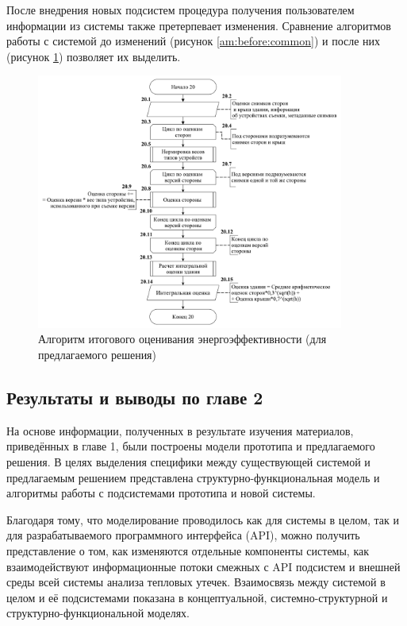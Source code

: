 \pagebreak

\par
	После внедрения новых подсистем процедура получения пользователем информации из системы также претерпевает изменения. Сравнение алгоритмов работы с системой до изменений (рисунок \ref{am:before:common}) и после них (рисунок \ref{am:after:common}) позволяет их выделить.

	\begin{figure}[t!]
      \centering
      \includegraphics[width=0.9\textwidth]{images/am/am02_after}
      \caption{Алгоритм итогового оценивания энергоэффективности (для предлагаемого решения)}
      \label{am:after:common}
    \end{figure}

\pagebreak

\subsection{Результаты и выводы по главе 2}
\label{sec:models:summary}

\par
	На основе информации, полученных в результате изучения материалов, приведённых в главе 1, были построены модели прототипа и предлагаемого решения. В целях выделения специфики между существующей системой и предлагаемым решением представлена структурно-функциональная модель и алгоритмы работы с подсистемами прототипа и новой системы.

	Благодаря тому, что моделирование проводилось как для системы в целом, так и для разрабатываемого программного интерфейса (API), можно получить представление о том, как изменяются отдельные компоненты системы, как взаимодействуют информационные потоки смежных с API подсистем и внешней среды всей системы анализа тепловых утечек. Взаимосвязь между системой в целом и её подсистемами показана в концептуальной, системно-структурной и структурно-функциональной моделях.

